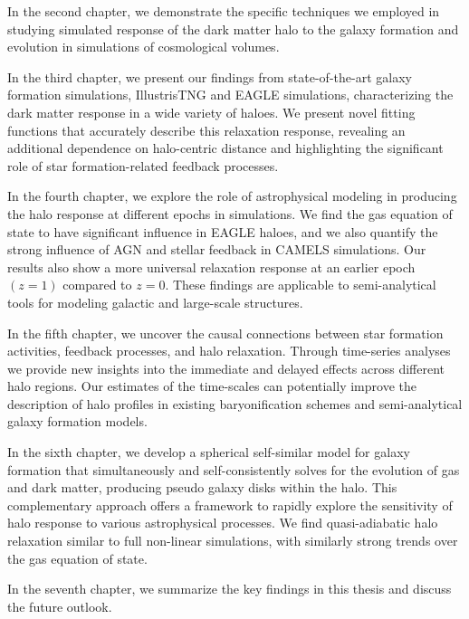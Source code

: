 \documentclass[a4paper, 12pt, oneside]{Thesis}  %
\begin{document}
In the second chapter, we demonstrate the specific techniques we employed in studying simulated response of the dark matter halo to the galaxy formation and evolution in simulations of cosmological volumes.

In the third chapter, we present our findings from state-of-the-art galaxy formation simulations, IllustrisTNG and EAGLE simulations, characterizing the dark matter response in a wide variety of haloes. We present novel fitting functions that accurately describe this relaxation response, revealing an additional dependence on halo-centric distance and highlighting the significant role of star formation-related feedback processes. 

In the fourth chapter, we explore the role of astrophysical modeling in producing the halo response at different epochs in simulations. We find the gas equation of state to have significant influence in EAGLE haloes, and we also quantify the strong influence of AGN and stellar feedback in CAMELS simulations. Our results also show a more universal relaxation response at an earlier epoch $(z=1)$ compared to $z=0$. These findings are applicable to semi-analytical tools for modeling galactic and large-scale structures. 

In the fifth chapter, we uncover the causal connections between star formation activities, feedback processes, and halo relaxation. Through time-series analyses we provide new insights into the immediate and delayed effects across different halo regions. Our estimates of the time-scales can potentially improve the description of halo profiles in existing baryonification schemes and semi-analytical galaxy formation models. 

In the sixth chapter, we develop a spherical self-similar model for galaxy formation that simultaneously and self-consistently solves for the evolution of gas and dark matter, producing pseudo galaxy disks within the halo. This complementary approach offers a framework to rapidly explore the sensitivity of halo response to various astrophysical processes. We find quasi-adiabatic halo relaxation similar to full non-linear simulations, with similarly strong trends over the gas equation of state.

In the seventh chapter, we summarize the key findings in this thesis and discuss the future outlook.

\end{document}
